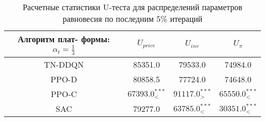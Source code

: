 \bgroup
\def\arraystretch{1.25}
\begin{table}[H]
	\caption{Расчетные статистики U-теста для распределений параметров равновесия по последним 5\% итераций}
	\label{tables:U_fixed}
	\begin{center}
		\vspace{-0.5em}
		\begin{tabular}{c||ccc}
			\toprule
			\makecell{Алгоритм плат-\\ формы: $\alpha_t = \frac{1}{3}$} & $U_{price}$ & $U_{inv}$ & $U_{\pi}$ \\
			\midrule
			TN-DDQN & \makecell[c]{ 85351.0\\[1ex] } & \makecell[c]{ 79533.0\\[1ex] } & \makecell[c]{ 74984.0\\[1ex] } \\
			PPO-D & \makecell[c]{ 80858.5\\[1ex] } & \makecell[c]{ 77724.0\\[1ex] } & \makecell[c]{ 74648.0\\[1ex] } \\
			PPO-C & \makecell[c]{ $67393.0^{***}_{<} $\\[1ex] } & \makecell[c]{ $91117.0^{***}_{>} $\\[1ex] } & \makecell[c]{ $65550.0^{***}_{<} $\\[1ex] } \\
			SAC & \makecell[c]{ 79277.0\\[1ex] } & \makecell[c]{ $63785.0^{***}_{<} $\\[1ex] } & \makecell[c]{ $30351.0^{***}_{<} $\\[1ex] } \\
			\bottomrule
		\end{tabular}
	\end{center}
\end{table}
\egroup